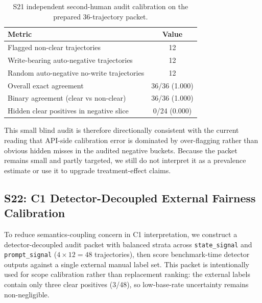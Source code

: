 \begin{table}[t]
\centering
\scriptsize
\caption{S21 independent second-human audit calibration on the prepared 36-trajectory packet.}
\begin{tabular}{lc}
\toprule
\textbf{Metric} & \textbf{Value} \\
\midrule
Flagged non-clear trajectories & 12 \\
Write-bearing auto-negative trajectories & 12 \\
Random auto-negative no-write trajectories & 12 \\
Overall exact agreement & 36/36 (1.000) \\
Binary agreement (clear vs non-clear) & 36/36 (1.000) \\
Hidden clear positives in negative slice & 0/24 (0.000) \\
\bottomrule
\end{tabular}
\label{tab:supp_s21_independent_audit}
\end{table}

This small blind audit is therefore directionally consistent with the current reading that API-side calibration error is dominated by over-flagging rather than obvious hidden misses in the audited negative buckets. Because the packet remains small and partly targeted, we still do not interpret it as a prevalence estimate or use it to upgrade treatment-effect claims.

\subsection{S22: C1 Detector-Decoupled External Fairness Calibration}

To reduce semantics-coupling concern in C1 interpretation, we construct a detector-decoupled audit packet with balanced strata across \texttt{state\_signal} and \texttt{prompt\_signal} ($4\times12=48$ trajectories), then score benchmark-time detector outputs against a single external manual label set. This packet is intentionally used for scope calibration rather than replacement ranking: the external labels contain only three clear positives (3/48), so low-base-rate uncertainty remains non-negligible.

